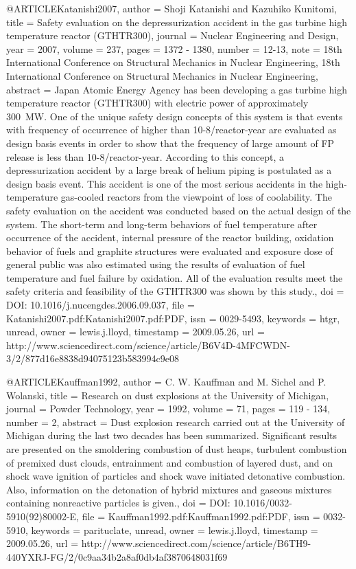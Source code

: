 {@ARTICLE{Katanishi2007,
  author = {Shoji Katanishi and Kazuhiko Kunitomi},
  title = {Safety evaluation on the depressurization accident in the gas turbine
	high temperature reactor (GTHTR300)},
  journal = {Nuclear Engineering and Design},
  year = {2007},
  volume = {237},
  pages = {1372 - 1380},
  number = {12-13},
  note = {18th International Conference on Structural Mechanics in Nuclear
	Engineering, 18th International Conference on Structural Mechanics
	in Nuclear Engineering},
  abstract = {Japan Atomic Energy Agency has been developing a gas turbine high
	temperature reactor (GTHTR300) with electric power of approximately
	300 MW. One of the unique safety design concepts of this system is
	that events with frequency of occurrence of higher than 10-8/reactor-year
	are evaluated as design basis events in order to show that the frequency
	of large amount of FP release is less than 10-8/reactor-year. According
	to this concept, a depressurization accident by a large break of
	helium piping is postulated as a design basis event. This accident
	is one of the most serious accidents in the high-temperature gas-cooled
	reactors from the viewpoint of loss of coolability. The safety evaluation
	on the accident was conducted based on the actual design of the system.
	The short-term and long-term behaviors of fuel temperature after
	occurrence of the accident, internal pressure of the reactor building,
	oxidation behavior of fuels and graphite structures were evaluated
	and exposure dose of general public was also estimated using the
	results of evaluation of fuel temperature and fuel failure by oxidation.
	All of the evaluation results meet the safety criteria and feasibility
	of the GTHTR300 was shown by this study.},
  doi = {DOI: 10.1016/j.nucengdes.2006.09.037},
  file = {Katanishi2007.pdf:Katanishi2007.pdf:PDF},
  issn = {0029-5493},
  keywords = {htgr, unread},
  owner = {lewis.j.lloyd},
  timestamp = {2009.05.26},
  url = {http://www.sciencedirect.com/science/article/B6V4D-4MFCWDN-3/2/877d16e8838d94075123b583994c9e08}
}

@ARTICLE{Kauffman1992,
  author = {C. W. Kauffman and M. Sichel and P. Wolanski},
  title = {Research on dust explosions at the University of Michigan},
  journal = {Powder Technology},
  year = {1992},
  volume = {71},
  pages = {119 - 134},
  number = {2},
  abstract = {Dust explosion research carried out at the University of Michigan
	during the last two decades has been summarized. Significant results
	are presented on the smoldering combustion of dust heaps, turbulent
	combustion of premixed dust clouds, entrainment and combustion of
	layered dust, and on shock wave ignition of particles and shock wave
	initiated detonative combustion. Also, information on the detonation
	of hybrid mixtures and gaseous mixtures containing nonreactive particles
	is given.},
  doi = {DOI: 10.1016/0032-5910(92)80002-E},
  file = {Kauffman1992.pdf:Kauffman1992.pdf:PDF},
  issn = {0032-5910},
  keywords = {parituclate, unread},
  owner = {lewis.j.lloyd},
  timestamp = {2009.05.26},
  url = {http://www.sciencedirect.com/science/article/B6TH9-440YXRJ-FG/2/0c9aa34b2a8af0db4af3870648031f69}
}

}
